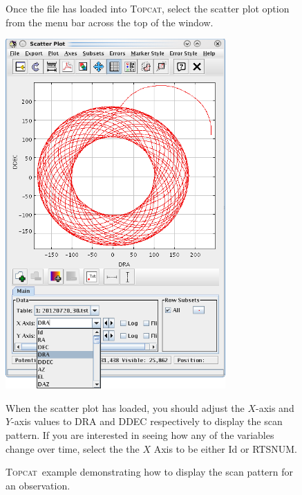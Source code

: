 \documentclass[twoside,11pt]{article}
\newcommand{\htmladdnormallink}[2]{#1}
\newenvironment{latexonly}{}{}
\renewcommand{\_}{\texttt{\symbol{95}}}
\newenvironment{fmpage}[1]{\begin{lrbox}{\fmbox}\begin{minipage}{#1}}{\end{minipage}\end{lrbox}\fbox{\usebox{\fmbox}}}
\newcommand{\topcat}{\htmladdnormallink{\textsc{Topcat}}{http://www.starlink.ac.uk/topcat}}
\begin{document}
\begin{latexonly}
\begin{figure}[ht!]
\begin{center}
\begin{fmpage}{0.95\linewidth}
\begin{minipage}[c]{0.6\linewidth}
\end{minipage}
\hspace{0.3cm}
\begin{minipage}[c]{0.32\linewidth}
Once the file has loaded into \topcat, select the scatter plot option
from the menu bar across the top of the window.
\end{minipage}

\vspace{0.5cm}

\begin{minipage}[c]{0.6\linewidth}
\centering
\includegraphics[width=0.75\textwidth]{sc21_topcat2}
\vspace{0.2cm}
\end{minipage}
\hspace{0.3cm}
\begin{minipage}[c]{0.32\linewidth}
When the scatter plot has loaded, you should adjust the $X$-axis and
$Y$-axis values to DRA and DDEC respectively to display the scan pattern.
If you are interested in seeing how any of the variables change over time,
select the the $X$ Axis to be either Id or RTS\_NUM.
\end{minipage}

\end{fmpage}
\end{center}
\caption[Displaying the scan pattern with \topcat]{
  \small \topcat\ example demonstrating how to display
  the scan pattern for an observation.
}
\label{fig:topcat}
\end{figure}
\end{latexonly}
\end{document}
